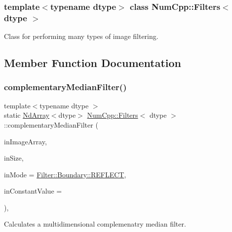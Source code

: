 \subsubsection*{template$<$typename dtype$>$\newline
class Num\+Cpp\+::\+Filters$<$ dtype $>$}

Class for performing many types of image filtering. 

\subsection{Member Function Documentation}
\mbox{\label{class_num_cpp_1_1_filters_aae121f772eb9a6f8eb1f13a15327ac22}} 
\subsubsection{\texorpdfstring{complementary\+Median\+Filter()}{complementaryMedianFilter()}}
{\footnotesize\ttfamily template$<$typename dtype $>$ \\
static \mbox{\hyperlink{class_num_cpp_1_1_nd_array}{Nd\+Array}}$<$dtype$>$ \mbox{\hyperlink{class_num_cpp_1_1_filters}{Num\+Cpp\+::\+Filters}}$<$ dtype $>$\+::complementary\+Median\+Filter (\begin{DoxyParamCaption}\item[{const \mbox{\hyperlink{class_num_cpp_1_1_nd_array}{Nd\+Array}}$<$ dtype $>$ \&}]{in\+Image\+Array,  }\item[{\mbox{\hyperlink{namespace_num_cpp_a36f388e948380413c63011cab9b7fbd5}{uint32}}}]{in\+Size,  }\item[{\mbox{\hyperlink{struct_num_cpp_1_1_filter_1_1_boundary_a3fb520b67d524104db12ceef41adf081}{Filter\+::\+Boundary\+::\+Mode}}}]{in\+Mode = {\ttfamily \mbox{\hyperlink{struct_num_cpp_1_1_filter_1_1_boundary_a3fb520b67d524104db12ceef41adf081ad0d71a6dafb7ae1e96441e3f9f7aced8}{Filter\+::\+Boundary\+::\+R\+E\+F\+L\+E\+CT}}},  }\item[{dtype}]{in\+Constant\+Value = {} }\end{DoxyParamCaption})\hspace{0.3cm}{\ttfamily [inline]}, {\ttfamily [static]}}

Calculates a multidimensional complemenatry median filter.


